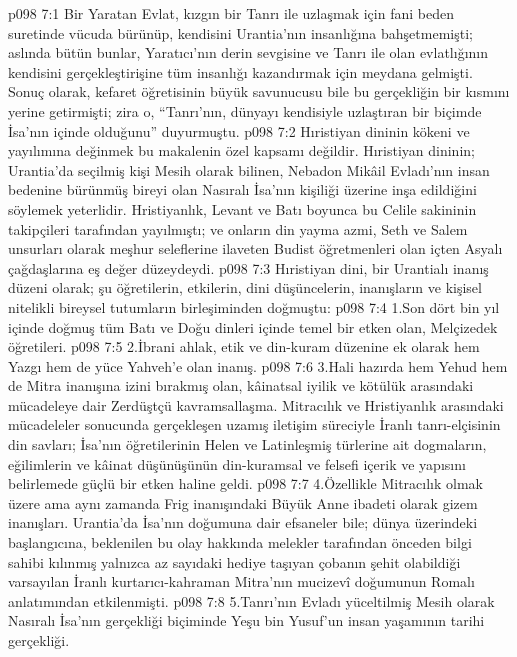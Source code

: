 \vs p098 7:1 Bir Yaratan Evlat, kızgın bir Tanrı ile uzlaşmak için fani beden suretinde vücuda bürünüp, kendisini Urantia’nın insanlığına bahşetmemişti; aslında bütün bunlar, Yaratıcı’nın derin sevgisine ve Tanrı ile olan evlatlığının kendisini gerçekleştirişine tüm insanlığı kazandırmak için meydana gelmişti. Sonuç olarak, kefaret öğretisinin büyük savunucusu bile bu gerçekliğin bir kısmını yerine getirmişti; zira o, “Tanrı’nın, dünyayı kendisiyle uzlaştıran bir biçimde İsa’nın içinde olduğunu” duyurmuştu.
\vs p098 7:2 Hıristiyan dininin kökeni ve yayılımına değinmek bu makalenin özel kapsamı değildir. Hıristiyan dininin; Urantia’da seçilmiş kişi Mesih olarak bilinen, Nebadon Mikâil Evladı’nın insan bedenine bürünmüş bireyi olan Nasıralı İsa’nın kişiliği üzerine inşa edildiğini söylemek yeterlidir. Hristiyanlık, Levant ve Batı boyunca bu Celile sakininin takipçileri tarafından yayılmıştı; ve onların din yayma azmi, Seth ve Salem unsurları olarak meşhur seleflerine ilaveten Budist öğretmenleri olan içten Asyalı çağdaşlarına eş değer düzeydeydi.
\vs p098 7:3 Hıristiyan dini, bir Urantialı inanış düzeni olarak; şu öğretilerin, etkilerin, dini düşüncelerin, inanışların ve kişisel nitelikli bireysel tutumların birleşiminden doğmuştu:
\vs p098 7:4 1.\bibnobreakspace Son dört bin yıl içinde doğmuş tüm Batı ve Doğu dinleri içinde temel bir etken olan, Melçizedek öğretileri.
\vs p098 7:5 2.\bibnobreakspace İbrani ahlak, etik ve din\hyp{}kuram düzenine ek olarak hem Yazgı hem de yüce Yahveh’e olan inanış.
\vs p098 7:6 3.\bibnobreakspace Hali hazırda hem Yehud hem de Mitra inanışına izini bırakmış olan, kâinatsal iyilik ve kötülük arasındaki mücadeleye dair Zerdüştçü kavramsallaşma. Mitracılık ve Hristiyanlık arasındaki mücadeleler sonucunda gerçekleşen uzamış iletişim süreciyle İranlı tanrı\hyp{}elçisinin din savları; İsa’nın öğretilerinin Helen ve Latinleşmiş türlerine ait dogmaların, eğilimlerin ve kâinat düşünüşünün din\hyp{}kuramsal ve felsefi içerik ve yapısını belirlemede güçlü bir etken haline geldi.
\vs p098 7:7 4.\bibnobreakspace Özellikle Mitracılık olmak üzere ama aynı zamanda Frig inanışındaki Büyük Anne ibadeti olarak gizem inanışları. Urantia’da İsa’nın doğumuna dair efsaneler bile; dünya üzerindeki başlangıcına, beklenilen bu olay hakkında melekler tarafından önceden bilgi sahibi kılınmış yalnızca az sayıdaki hediye taşıyan çobanın şehit olabildiği varsayılan İranlı kurtarıcı\hyp{}kahraman Mitra’nın mucizevî doğumunun Romalı anlatımından etkilenmişti.
\vs p098 7:8 5.\bibnobreakspace Tanrı’nın Evladı yüceltilmiş Mesih olarak Nasıralı İsa’nın gerçekliği biçiminde Yeşu bin Yusuf’un insan yaşamının tarihi gerçekliği.
